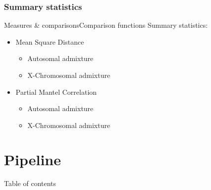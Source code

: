 \documentclass[10pt, aspectratio=43]{beamer}
\begin{document}
\subsubsection{Summary statistics}
\begin{frame}{Measures \& comparisons}{Comparison functions}
Summary statistics:
\begin{itemize}
  \item Mean Square Distance
  \begin{itemize}
    \item Autosomal admixture
    \item X-Chromosomal admixture
  \end{itemize}
  \item Partial Mantel Correlation
  \begin{itemize}
    \item Autosomal admixture
    \item X-Chromosomal admixture
  \end{itemize}
\end{itemize}
\end{frame}


\section{Pipeline}
\begin{frame}{}{Table of contents}
\tableofcontents[currentsection, subsectionstyle=show/show/hide]
\end{frame}
\end{document}
